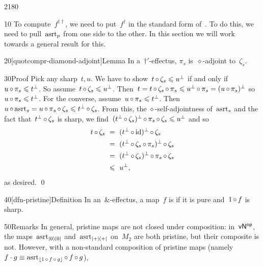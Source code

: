 \begin{parsec}{2180}%
\begin{point}{10}%
To compute~$f^{\dagger\dagger}$,
    we need to put~$f^\dagger$
    in the standard form of~.
To do this, we need to pull~$\mathrm{asrt}_p$ from one side to the other.
In this section we will work towards a general result for this.
\end{point}
\begin{point}{20}[quotcompr-diamond-adjoint]{Lemma}%
In a~$\dagger'$-effectus,
$\pi_s$ is~$\diamond$-adjoint to~$\zeta_s$.
\begin{point}{30}{Proof}%
    Pick any sharp~$t,u$.
We have to
    show~$t \mathop{\circ} \zeta_s \leqslant u^\perp$
    if and only if~$u \mathop{\circ} \pi_s \leqslant t^\perp$.
So assume~$t \mathop{\circ} \zeta_s \leqslant u^\perp$.
Then~$t =  t\mathop{\circ} \zeta_s \mathop{\circ} \pi_s  \leqslant  u^\perp \mathop{\circ} \pi_s
                 =  (u \mathop{\circ} \pi_s)^\perp$
    so~$u \mathop{\circ} \pi_s \leqslant t^\perp$.
For the converse, assume~$u \mathop{\circ} \pi_s \leqslant t^\perp$.
Then~$u \mathop{\circ} \mathrm{asrt}_s = u \mathop{\circ} \pi_s \mathop{\circ} \zeta_s \leqslant t^\perp \mathop{\circ} \zeta_s$.
From this,
    the
    $\diamond$-self-adjointness of~$\mathrm{asrt}_s$
    and the fact that~$t^\perp \mathop{\circ} \zeta_s$ is sharp,
    we find~$(t^\perp \mathop{\circ} \zeta_s)^\perp \mathop{\circ} \pi_s \mathop{\circ} \zeta_s \leqslant
        u^\perp$
    and so
\begin{alignat*}{2}
    t \mathop{\circ} \zeta_s
    &\ =\  (t^\perp \mathop{\circ} \mathrm{id})^\perp \mathop{\circ} \zeta_s \\
    &\ =\  (t^\perp \mathop{\circ} \zeta_s \mathop{\circ} \pi_s)^\perp \mathop{\circ} \zeta_s \\
    &\ =\  (t^\perp \mathop{\circ} \zeta_s)^\perp \mathop{\circ} \pi_s \mathop{\circ} \zeta_s \\
    &\ \leqslant \ u^\perp,
\end{alignat*}
as desired. \qed
\end{point}
\end{point}
\begin{point}{40}[dfn-pristine]{Definition}%
    In an~$\&$-effectus, a map~$f$ is 
        if it is pure and~$1\mathop{\circ} f$ is sharp.
\begin{point}{50}{Remarks}%
    In general, pristine maps are not closed under composition:
    in~${\mathsf{vN}}{^{\mathsf{op}}}$, the maps~$\mathrm{asrt}_{\left|0\right>\!\left<0\right|}$
            and~$\mathrm{asrt}_{\left|+\right>\!\left<+\right|}$ on~$M_2$
            are both pristine,
            but their composite is not.
However, with a non-standard composition
    of pristine maps
    (namely~$f \cdot g \equiv \mathrm{asrt}_{\left\lfloor1 \mathop{\circ} f \mathop{\circ} g\right\rfloor}
    \mathop{\circ} f \mathop{\circ} g$),

\end{point}
\end{point}
\end{parsec}
